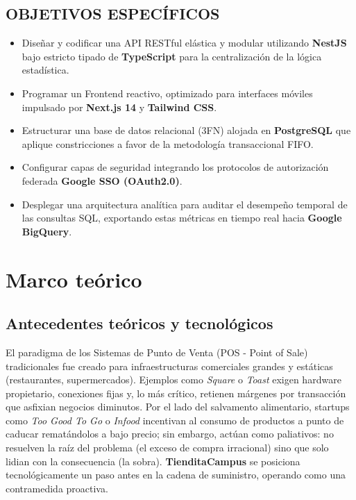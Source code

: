 \documentclass[12pt, a4paper]{article}
\begin{document}
\subsection{OBJETIVOS ESPECÍFICOS}
\begin{itemize}
    \item Diseñar y codificar una API RESTful elástica y modular utilizando \textbf{NestJS} bajo estricto tipado de \textbf{TypeScript} para la centralización de la lógica estadística.
    \item Programar un Frontend reactivo, optimizado para interfaces móviles impulsado por \textbf{Next.js 14} y \textbf{Tailwind CSS}.
    \item Estructurar una base de datos relacional (3FN) alojada en \textbf{PostgreSQL} que aplique constricciones a favor de la metodología transaccional FIFO.
    \item Configurar capas de seguridad integrando los protocolos de autorización federada \textbf{Google SSO (OAuth2.0)}.
    \item Desplegar una arquitectura analítica para auditar el desempeño temporal de las consultas SQL, exportando estas métricas en tiempo real hacia \textbf{Google BigQuery}.
\end{itemize}

\section{Marco teórico}

\subsection{Antecedentes teóricos y tecnológicos}
El paradigma de los Sistemas de Punto de Venta (POS - Point of Sale) tradicionales fue creado para infraestructuras comerciales grandes y estáticas (restaurantes, supermercados). Ejemplos como \textit{Square} o \textit{Toast} exigen hardware propietario, conexiones fijas y, lo más crítico, retienen márgenes por transacción que asfixian negocios diminutos. Por el lado del salvamento alimentario, startups como \textit{Too Good To Go} o \textit{Infood} incentivan al consumo de productos a punto de caducar rematándolos a bajo precio; sin embargo, actúan como paliativos: no resuelven la raíz del problema (el exceso de compra irracional) sino que solo lidian con la consecuencia (la sobra). \textbf{TienditaCampus} se posiciona tecnológicamente un paso antes en la cadena de suministro, operando como una contramedida proactiva.
\end{document}
